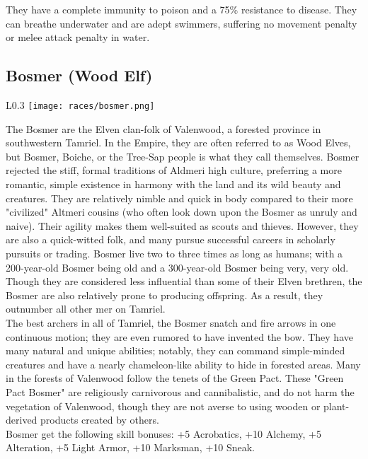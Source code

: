 They have a complete immunity to poison and a 75\% resistance to disease. They can breathe underwater and are adept swimmers, suffering no movement penalty or melee attack penalty in water.

\subsection{Bosmer (Wood Elf)}
\begin{wrapfigure}{L}{0.3\textwidth}
	\texttt{[image: races/bosmer.png]}
\end{wrapfigure}

The Bosmer are the Elven clan-folk of Valenwood, a forested province in southwestern Tamriel. In the Empire, they are often referred to as Wood Elves, but Bosmer, Boiche, or the Tree-Sap people is what they call themselves. Bosmer rejected the stiff, formal traditions of Aldmeri high culture, preferring a more romantic, simple existence in harmony with the land and its wild beauty and creatures. They are relatively nimble and quick in body compared to their more "civilized" Altmeri cousins (who often look down upon the Bosmer as unruly and naive). Their agility makes them well-suited as scouts and thieves. However, they are also a quick-witted folk, and many pursue successful careers in scholarly pursuits or trading. Bosmer live two to three times as long as humans; with a 200-year-old Bosmer being old and a 300-year-old Bosmer being very, very old. Though they are considered less influential than some of their Elven brethren, the Bosmer are also relatively prone to producing offspring. As a result, they outnumber all other mer on Tamriel.\\

The best archers in all of Tamriel, the Bosmer snatch and fire arrows in one continuous motion; they are even rumored to have invented the bow. They have many natural and unique abilities; notably, they can command simple-minded creatures and have a nearly chameleon-like ability to hide in forested areas. Many in the forests of Valenwood follow the tenets of the Green Pact. These "Green Pact Bosmer" are religiously carnivorous and cannibalistic, and do not harm the vegetation of Valenwood, though they are not averse to using wooden or plant-derived products created by others.\\

Bosmer get the following skill bonuses: +5 Acrobatics, +10 Alchemy, +5 Alteration, +5 Light Armor, +10 Marksman, +10 Sneak.\\

